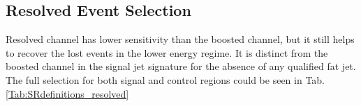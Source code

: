 \subsection{Resolved Event Selection}
Resolved channel has lower sensitivity than the boosted channel, but it still helps to recover the lost events in the lower energy regime. It is distinct from the boosted channel in the signal jet signature for the absence of any qualified fat jet. The full selection for both signal and control regions could be seen in Tab. \ref{Tab:SRdefinitions_resolved}
\begin{table}[t]
	\caption{Summary of the selection criteria of of the  the resolved analysis for the $WW$ and $WZ$ signal regions (SR), $W$+jets control region (WR) and $ t\bar{t}$ control region (TR). } \label{Tab:SRdefinitions_resolved}
	\begin{center}
\end{center}
\end{table}
